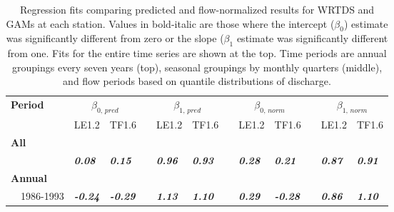 \documentclass[letterpaper,12pt,oneside]{article}\usepackage[]{graphicx}\usepackage[]{color}
\begin{document}
\begin{table}[!tbp]
\caption{Regression fits comparing predicted and flow-normalized results for \ac{WRTDS} and \acp{GAM} at each station.  Values in bold-italic are those where the intercept ($\beta_0$) estimate was significantly different from zero or the slope ($\beta_{1}$ estimate was significantly different from one. Fits for the entire time series are shown at the top.  Time periods are annual groupings every seven years (top), seasonal groupings by monthly quarters (middle), and flow periods based on quantile distributions of discharge.\label{tab:regprednorm}} 
\begin{center}
\begin{tabular}{lllcllcllcll}
\hline\hline
\multicolumn{1}{l}{\bfseries Period}&\multicolumn{2}{c}{\bfseries $\beta_{0,\,pred}$}&\multicolumn{1}{c}{\bfseries }&\multicolumn{2}{c}{\bfseries $\beta_{1,\,pred}$}&\multicolumn{1}{c}{\bfseries }&\multicolumn{2}{c}{\bfseries $\beta_{0,\,norm}$}&\multicolumn{1}{c}{\bfseries }&\multicolumn{2}{c}{\bfseries $\beta_{1,\,norm}$}\tabularnewline
\cline{2-3} \cline{5-6} \cline{8-9} \cline{11-12}
\multicolumn{1}{l}{}&\multicolumn{1}{c}{LE1.2}&\multicolumn{1}{c}{TF1.6}&\multicolumn{1}{c}{}&\multicolumn{1}{c}{LE1.2}&\multicolumn{1}{c}{TF1.6}&\multicolumn{1}{c}{}&\multicolumn{1}{c}{LE1.2}&\multicolumn{1}{c}{TF1.6}&\multicolumn{1}{c}{}&\multicolumn{1}{c}{LE1.2}&\multicolumn{1}{c}{TF1.6}\tabularnewline
\hline
{\bfseries All}&&&&&&&&&&&\tabularnewline
~~&{\bf \textit{0.08}}&{\bf \textit{0.15}}&&{\bf \textit{0.96}}&{\bf \textit{0.93}}&&{\bf \textit{0.28}}&{\bf \textit{0.21}}&&{\bf \textit{0.87}}&{\bf \textit{0.91}}\tabularnewline
\hline
{\bfseries Annual}&&&&&&&&&&&\tabularnewline
~~1986-1993&{\bf \textit{-0.24}}&{\bf \textit{-0.29}}&&{\bf \textit{1.13}}&{\bf \textit{1.10}}&&{\bf \textit{0.29}}&{\bf \textit{-0.28}}&&{\bf \textit{0.86}}&{\bf \textit{1.10}}\tabularnewline

\end{tabular}
\end{center}
\end{table}
\end{document}
